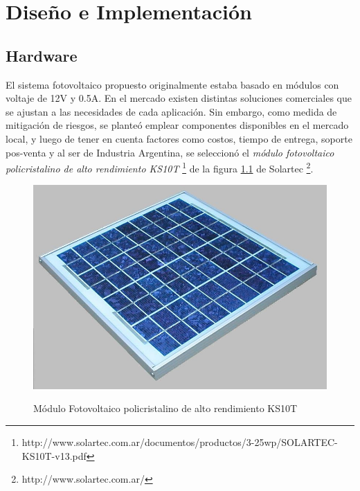 
\chapter{Diseño e Implementación} %

\label{Chapter3} %

\section{Hardware}
\label{sec:hard}
El sistema fotovoltaico propuesto originalmente estaba basado en módulos con voltaje de 12V y 0.5A. En el mercado existen distintas soluciones comerciales que se ajustan a las necesidades de cada aplicación. Sin embargo, como medida de mitigación de riesgos, se planteó emplear componentes disponibles en el mercado local, y luego de tener en cuenta factores como costos, tiempo de entrega, soporte pos-venta y al ser de Industria Argentina, se seleccionó el \textit{módulo fotovoltaico policristalino de alto rendimiento KS10T} \footnote{http://www.solartec.com.ar/documentos/productos/3-25wp/SOLARTEC-KS10T-v13.pdf} de la figura \ref{fig:ks10t} de Solartec \footnote{http://www.solartec.com.ar/}.

 \begin{figure}[h!]
	\centering
    \includegraphics[width=1\textwidth]{./Figures/ks10t.jpg}
	\label{fig:ks10t}
	\caption{Módulo Fotovoltaico policristalino de alto rendimiento KS10T}
\end{figure}

